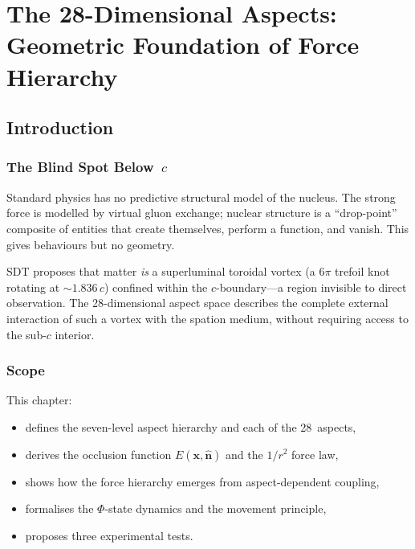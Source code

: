 \chapter{The 28-Dimensional Aspects: Geometric Foundation of Force Hierarchy}


\section{Introduction}

\subsection{The Blind Spot Below~$c$}

Standard physics has no predictive structural model of the nucleus.  The strong force is modelled by virtual gluon exchange; nuclear structure is a ``drop-point'' composite of entities that create themselves, perform a function, and vanish.  This gives behaviours but no geometry.

SDT proposes that matter \emph{is} a superluminal toroidal vortex (a $6\pi$ trefoil knot rotating at ${\sim}1.836\,c$) confined within the $c$-boundary---a region invisible to direct observation.  The 28-dimensional aspect space describes the complete external interaction of such a vortex with the spation medium, without requiring access to the sub-$c$ interior.

\subsection{Scope}

This chapter:
\begin{itemize}
  \item defines the seven-level aspect hierarchy and each of the 28~aspects,
  \item derives the occlusion function $E(\mathbf{x},\hat{\mathbf{n}})$ and the $1/r^2$ force law,
  \item shows how the force hierarchy emerges from aspect-dependent coupling,
  \item formalises the $\Phi$-state dynamics and the movement principle,
  \item proposes three experimental tests.
\end{itemize}


